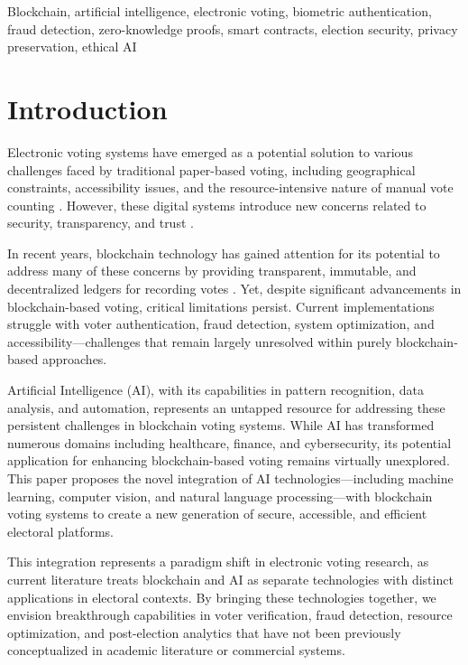 \documentclass[conference]{IEEEtran}
\begin{document}
\begin{IEEEkeywords}
Blockchain, artificial intelligence, electronic voting, biometric authentication, fraud detection, zero-knowledge proofs, smart contracts, election security, privacy preservation, ethical AI
\end{IEEEkeywords}

\section{Introduction}
Electronic voting systems have emerged as a potential solution to various challenges faced by traditional paper-based voting, including geographical constraints, accessibility issues, and the resource-intensive nature of manual vote counting \cite{b1}. However, these digital systems introduce new concerns related to security, transparency, and trust \cite{b2}. 

In recent years, blockchain technology has gained attention for its potential to address many of these concerns by providing transparent, immutable, and decentralized ledgers for recording votes \cite{b2}. Yet, despite significant advancements in blockchain-based voting, critical limitations persist. Current implementations struggle with voter authentication, fraud detection, system optimization, and accessibility—challenges that remain largely unresolved within purely blockchain-based approaches.

Artificial Intelligence (AI), with its capabilities in pattern recognition, data analysis, and automation, represents an untapped resource for addressing these persistent challenges in blockchain voting systems. While AI has transformed numerous domains including healthcare, finance, and cybersecurity, its potential application for enhancing blockchain-based voting remains virtually unexplored. This paper proposes the novel integration of AI technologies—including machine learning, computer vision, and natural language processing—with blockchain voting systems to create a new generation of secure, accessible, and efficient electoral platforms.

This integration represents a paradigm shift in electronic voting research, as current literature treats blockchain and AI as separate technologies with distinct applications in electoral contexts. By bringing these technologies together, we envision breakthrough capabilities in voter verification, fraud detection, resource optimization, and post-election analytics that have not been previously conceptualized in academic literature or commercial systems.
\end{document}
